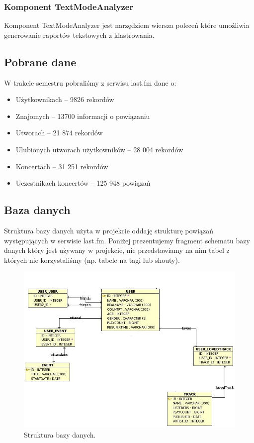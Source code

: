 \documentclass[10pt,a4paper]{article}
\begin{document}
\subsubsection {Komponent TextModeAnalyzer}
	Komponent TextModeAnalyzer jest narzędziem wiersza poleceń które umożliwia generowanie raportów tekstowych z klastrowania.


\subsection {Pobrane dane}
W trakcie semestru pobraliśmy z serwisu last.fm dane o:
\begin{itemize}
\item Użytkownikach – 9826 rekordów
\item Znajomych – 13700 informacji o powiązaniu
\item Utworach – 21 874 rekordów
\item Ulubionych utworach użytkowników – 28 004 rekordów
\item Koncertach – 31 251 rekordów
\item Uczestnikach koncertów – 125 948 powiązań
\end{itemize}
\subsection {Baza danych}
	Struktura bazy danych użyta w projekcie oddaję strukturę powiązań występujących w serwisie last.fm. Poniżej prezentujemy fragment schematu bazy danych który jest używany w projekcie, nie przedstawiamy na nim tabel z których nie korzystaliśmy (np. tabele na tagi lub shouty).

\begin{figure}[H]
\centering
\caption{Struktura bazy danych.}
\includegraphics[scale=0.6]{rys2.PNG}
\end{figure}
\end{document}
